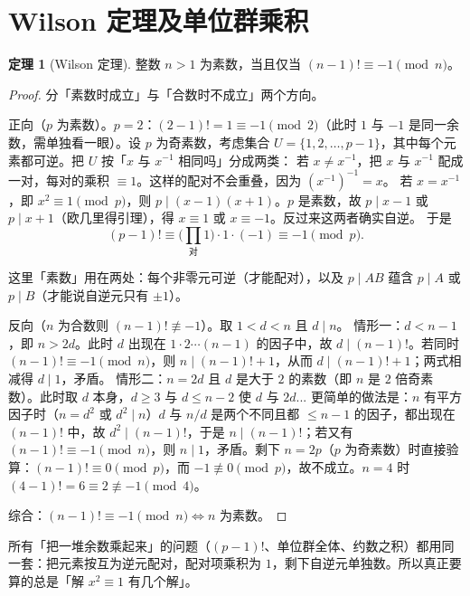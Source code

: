 \documentclass[UTF8,a4paper,11pt,oneside,openany,fontset=fandol]{ctexbook}
\theoremstyle{definition}
\newtheorem{theorem}[definition]{定理}
\begin{document}
\section{Wilson 定理及单位群乘积}
\begin{theorem}[Wilson 定理]
整数 $n>1$ 为素数，当且仅当 $(n-1)!\equiv-1\pmod n$。
\end{theorem}
\begin{proof}
分「素数时成立」与「合数时不成立」两个方向。

正向（$p$ 为素数）。$p=2$：$(2-1)!=1\equiv-1\pmod2$（此时 $1$ 与 $-1$ 是同一余数，需单独看一眼）。设 $p$ 为奇素数，考虑集合 $U=\{1,2,\ldots,p-1\}$，其中每个元素都可逆。把 $U$ 按「$x$ 与 $x^{-1}$ 相同吗」分成两类：
若 $x\ne x^{-1}$，把 $x$ 与 $x^{-1}$ 配成一对，每对的乘积 $\equiv1$。这样的配对不会重叠，因为 $(x^{-1})^{-1}=x$。
若 $x=x^{-1}$，即 $x^2\equiv1\pmod p$，则 $p\mid(x-1)(x+1)$。$p$ 是素数，故 $p\mid x-1$ 或 $p\mid x+1$（欧几里得引理），得 $x\equiv1$ 或 $x\equiv-1$。反过来这两者确实自逆。
于是
\[
 (p-1)!\equiv\Big(\prod_{\text{对}}1\Big)\cdot1\cdot(-1)\equiv-1\pmod p .
\]



这里「素数」用在两处：每个非零元可逆（才能配对），以及 $p\mid AB$ 蕴含 $p\mid A$ 或 $p\mid B$（才能说自逆元只有 $\pm1$）。

反向（$n$ 为合数则 $(n-1)!\not\equiv-1$）。取 $1<d<n$ 且 $d\mid n$。
情形一：$d<n-1$，即 $n>2d$。此时 $d$ 出现在 $1\cdot2\cdots(n-1)$ 的因子中，故 $d\mid(n-1)!$。若同时 $(n-1)!\equiv-1\pmod n$，则 $n\mid(n-1)!+1$，从而 $d\mid(n-1)!+1$；两式相减得 $d\mid1$，矛盾。
情形二：$n=2d$ 且 $d$ 是大于 $2$ 的素数（即 $n$ 是 $2$ 倍奇素数）。此时取 $d$ 本身，$d\ge3$ 与 $d\le n-2$ 使 $d$ 与 $2d$... 更简单的做法是：$n$ 有平方因子时（$n=d^2$ 或 $d^2\mid n$）$d$ 与 $n/d$ 是两个不同且都 $\le n-1$ 的因子，都出现在 $(n-1)!$ 中，故 $d^2\mid(n-1)!$，于是 $n\mid(n-1)!$；若又有 $(n-1)!\equiv-1\pmod n$，则 $n\mid1$，矛盾。剩下 $n=2p$（$p$ 为奇素数）时直接验算：$(n-1)!\equiv0\pmod p$，而 $-1\not\equiv0\pmod p$，故不成立。$n=4$ 时 $(4-1)!=6\equiv2\not\equiv-1\pmod4$。

综合：$(n-1)!\equiv-1\pmod n\iff n$ 为素数。
\end{proof}

\begin{tip}[一节里其实在算什么乘积]
所有「把一堆余数乘起来」的问题（$(p-1)!$、单位群全体、约数之积）都用同一套：把元素按互为逆元配对，配对项乘积为 $1$，剩下自逆元单独数。所以真正要算的总是「解 $x^2\equiv1$ 有几个解」。
\end{tip}
\end{document}
